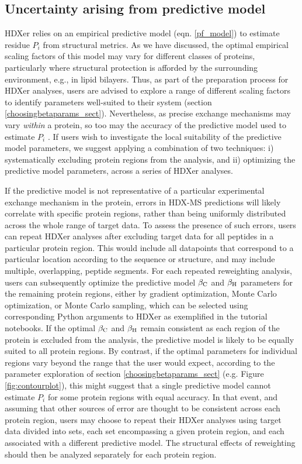\documentclass[9pt,tutorial]{livecoms}
\begin{document}
\subsection{Uncertainty arising from predictive model}
HDXer relies on an empirical predictive model (eqn. \ref{pf_model}) to estimate residue $P_i$ from structural metrics.
As we have discussed, the optimal empirical scaling factors of this model may vary for different classes of proteins, particularly where structural protection is afforded by the surrounding environment, e.g., in lipid bilayers.
Thus, as part of the preparation process for HDXer analyses, users are advised to explore a range of different scaling factors to identify parameters well-suited to their system (section \ref{choosingbetaparams_sect}).
Nevertheless, as precise exchange mechanisms may vary \textit{within} a protein, so too may the accuracy of the predictive model used to estimate $P_i$ \cite{Skinner2012models, Mohammadiarani2018, McAllister2015}.
If users wish to investigate the local suitability of the predictive model parameters, we suggest applying a combination of two techniques: i) systematically excluding protein regions from the analysis, and ii) optimizing the predictive model parameters, across a series of HDXer analyses. 

If the predictive model is not representative of a particular experimental exchange mechanism in the protein, errors in HDX-MS predictions will likely correlate with specific protein regions, rather than being uniformly distributed across the whole range of target data.
To assess the presence of such errors, users can repeat HDXer analyses after excluding target data for all peptides in a particular protein region.
This would include all datapoints that correspond to a particular location according to the sequence or structure, and may include multiple, overlapping, peptide segments.
For each repeated reweighting analysis, users can subsequently optimize the predictive model $\beta_\textnormal{C}$ and $\beta_\textnormal{H}$ parameters for the remaining protein regions, either by gradient optimization, Monte Carlo optimization, or Monte Carlo sampling, which can be selected using corresponding Python arguments to HDXer as exemplified in the tutorial notebooks.
If the optimal $\beta_\textnormal{C}$ and $\beta_\textnormal{H}$ remain consistent as each region of the protein is excluded from the analysis, the predictive model is likely to be equally suited to all protein regions.
By contrast, if the optimal parameters for individual regions vary beyond the range that the user would expect, according to the parameter exploration of section \ref{choosingbetaparams_sect} (e.g. Figure \ref{fig:contourplot}), this might suggest that a single predictive model cannot estimate $P_i$ for some protein regions with equal accuracy.
In that event, and assuming that other sources of error are thought to be consistent across each protein region, users may choose to repeat their HDXer analyses using target data divided into sets, each set encompassing a given protein region, and each associated with a different predictive model.
The structural effects of reweighting should then be analyzed separately for each protein region.
\end{document}
